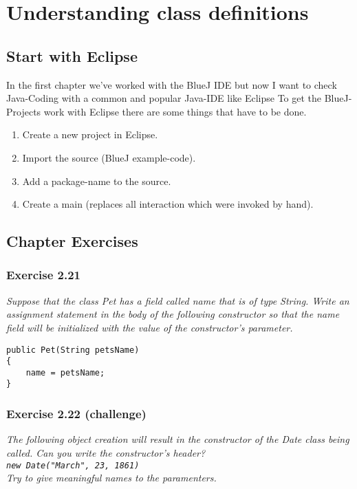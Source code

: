 \section{Understanding class definitions}

\subsection{Start with Eclipse}
In the first chapter we've worked with the BlueJ IDE but now I want to check
Java-Coding with a common and popular Java-IDE like Eclipse
To get the BlueJ-Projects work with Eclipse there are some things that have to
be done.

\begin{enumerate}
\item Create a new project in Eclipse.
\item Import the source (BlueJ example-code).
\item Add a package-name to the source.
\item Create a main (replaces all interaction which were invoked by hand).
\end{enumerate}





\newpage
\subsection{Chapter Exercises}
\subsubsection*{Exercise 2.21}
\textit{Suppose that the class Pet has a field called name that is of type
	String. Write an assignment statement in the body of the following 
	constructor so that the name field will be initialized with the value
	of the constructor's parameter.}\\

\begin{lstlisting}
public Pet(String petsName)
{
	name = petsName;
}
\end{lstlisting}

\subsubsection*{Exercise 2.22 (challenge)}
\textit{The following object creation will result in the constructor of the
	Date class being called. Can you write the constructor's header?\\
	\indent \lstinline{new Date("March", 23, 1861)}\\
	Try to give meaningful names to the paramenters.}\\

